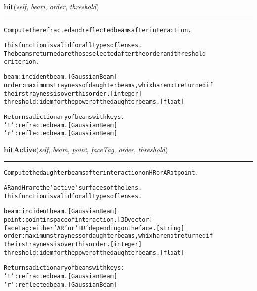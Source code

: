 \hspace{.8\funcindent}\begin{boxedminipage}{\funcwidth}

    \raggedright \textbf{hit}(\textit{self}, \textit{beam}, \textit{order}, \textit{threshold})

    \vspace{-1.5ex}

    \rule{\textwidth}{0.5\fboxrule}
\setlength{\parskip}{2ex}
\begin{alltt}
Compute the refracted and reflected beams after interaction.

This function is valid for all types of lenses.
The beams returned are those selected after the order and threshold
criterion.

beam: incident beam. [GaussianBeam]
order: maximum strayness of daughter beams, whixh are not returned if
    their strayness is over this order. [integer]
threshold: idem for the power of the daughter beams. [float]

Returns a dictionary of beams with keys:
    't': refracted beam. [GaussianBeam]
    'r': reflected beam. [GaussianBeam]
\end{alltt}

\setlength{\parskip}{1ex}
    \end{boxedminipage}

    \label{theia:optics:lens:Lens:hitActive}

    \vspace{0.5ex}

\hspace{.8\funcindent}\begin{boxedminipage}{\funcwidth}

    \raggedright \textbf{hitActive}(\textit{self}, \textit{beam}, \textit{point}, \textit{faceTag}, \textit{order}, \textit{threshold})

    \vspace{-1.5ex}

    \rule{\textwidth}{0.5\fboxrule}
\setlength{\parskip}{2ex}
\begin{alltt}
Compute the daughter beams after interaction on HR or AR at point.

AR andHr are the 'active' surfaces of the lens.
This function is valid for all types of lenses.

beam: incident beam. [GaussianBeam]
point: point in space of interaction. [3D vector]
faceTag: either 'AR' or 'HR' depending on the face. [string]
order: maximum strayness of daughter beams, whixh are not returned if
    their strayness is over this order. [integer]
threshold: idem for the power of the daughter beams. [float]

Returns a dictionary of beams with keys:
    't': refracted beam. [GaussianBeam]
    'r': reflected beam. [GaussianBeam]
\end{alltt}

\setlength{\parskip}{1ex}
    \end{boxedminipage}


